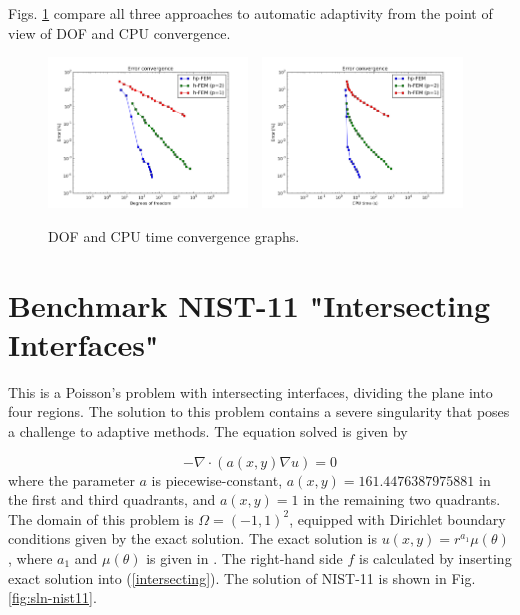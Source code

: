 \documentclass[12pt]{elsarticle}
\begin{document}

Figs. \ref{fig:nist-10-conv} compare all
three approaches to automatic adaptivity from the point
of view of DOF and CPU convergence.

\begin{figure}[!ht]
\centering
\includegraphics[height=4cm]{nist/nist-10/conv_dof_aniso.png}\ \
\includegraphics[height=4cm]{nist/nist-10/conv_cpu_aniso.png}
\caption{DOF and CPU time convergence graphs.}
\label{fig:nist-10-conv}
\end{figure}



\section{Benchmark NIST-11 "Intersecting Interfaces"}
\label{sec:bench-11}

This is a Poisson's problem with intersecting interfaces,
dividing the plane into four regions.
The solution to this problem contains a severe
singularity that poses a challenge to adaptive methods.
The equation solved is given by

\begin{equation} \label{intersecting}
-\nabla \cdot (a(x,y) \nabla u) = 0
\end{equation}
where the parameter $a$ is piecewise-constant,
$a(x,y) = 161.4476387975881$ in the first and third quadrants,
and $a(x,y) = 1$ in the remaining two quadrants.
The domain of this problem is $\Omega = (-1, 1)^2$, equipped with
Dirichlet boundary conditions given by the exact solution.
The exact solution is
$u(x,y) = r^{a_1} \mu (\theta)$,
where $a_1$ and $\mu (\theta)$ is given in \cite{mitchell-1}.
The right-hand side $f$ is calculated by inserting exact solution into (\ref{intersecting}).
The solution of NIST-11 is shown in Fig. \ref{fig:sln-nist11}.
\end{document}
